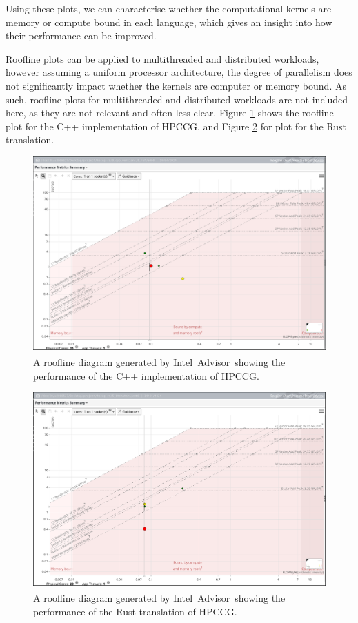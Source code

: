 Using these plots, we can characterise whether the computational kernels are memory or compute bound in each language, which gives an insight into how their performance can be improved.

Roofline plots can be applied to multithreaded and distributed workloads, however assuming a uniform processor architecture, the degree of parallelism does not significantly impact whether the kernels are computer or memory bound. As such, roofline plots for multithreaded and distributed workloads are not included here, as they are not relevant and often less clear. Figure \ref{fig:cpp-roofline} shows the roofline plot for the C++ implementation of HPCCG, and Figure \ref{fig:rust-roofline} for plot for the Rust translation.

\begin{figure}[H]
    \centering
    \includegraphics[width=\textwidth]{images/5_performance/rooflines/cpp_roofline.png}
    \caption{A roofline diagram generated by Intel\textsuperscript{\textregistered}\ Advisor\ showing the performance of the C++ implementation of HPCCG.}
    \label{fig:cpp-roofline}
\end{figure}

\begin{figure}[H]
    \centering
    \includegraphics[width=\textwidth]{images/5_performance/rooflines/rust_roofline.png}
    \caption{A roofline diagram generated by Intel\textsuperscript{\textregistered}\ Advisor\ showing the performance of the Rust translation of HPCCG.}
    \label{fig:rust-roofline}
\end{figure}


